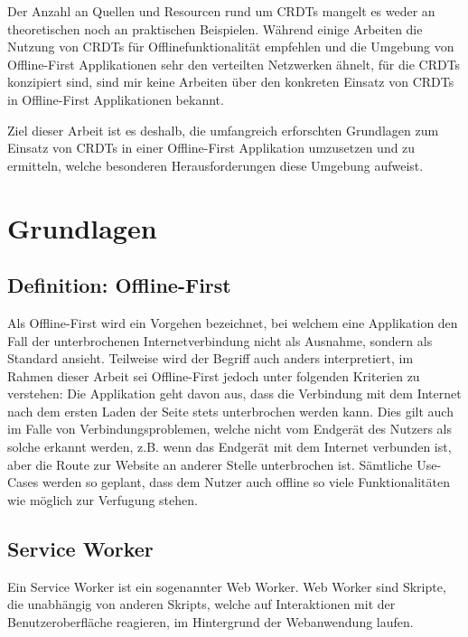 \documentclass[a4paper, 12pt]{scrreprt}
\begin{document}
Der Anzahl an Quellen und Resourcen rund um CRDTs mangelt es weder an theoretischen noch an praktischen Beispielen. Während einige Arbeiten die Nutzung von CRDTs für Offlinefunktionalität empfehlen und die Umgebung von Offline-First Applikationen sehr den verteilten Netzwerken ähnelt, für die CRDTs konzipiert sind, sind mir keine Arbeiten über den konkreten Einsatz von CRDTs in Offline-First Applikationen bekannt.

Ziel dieser Arbeit ist es deshalb, die umfangreich erforschten Grundlagen zum Einsatz von CRDTs in einer Offline-First Applikation umzusetzen und zu ermitteln, welche besonderen Herausforderungen diese Umgebung aufweist.
\chapter{Grundlagen}
\section{Definition: Offline-First}\label{sec:DefinitionOfflineFirst}
Als Offline-First wird ein Vorgehen bezeichnet, bei welchem eine Applikation den Fall der unterbrochenen Internetverbindung nicht als Ausnahme, sondern als Standard ansieht. Teilweise wird der Begriff auch anders interpretiert, im Rahmen dieser Arbeit sei Offline-First jedoch unter folgenden Kriterien zu verstehen: Die Applikation geht davon aus, dass die Verbindung mit dem Internet nach dem ersten Laden der Seite stets unterbrochen werden kann. Dies gilt auch im Falle von Verbindungsproblemen, welche nicht vom Endgerät des Nutzers als solche erkannt werden, z.B. wenn das Endgerät mit dem Internet verbunden ist, aber die Route zur Website an anderer Stelle unterbrochen ist. Sämtliche Use-Cases werden so geplant, dass dem Nutzer auch offline so viele Funktionalitäten wie möglich zur Verfugung stehen.



\section{Service Worker}
Ein Service Worker ist ein sogenannter Web Worker. Web Worker sind Skripte, die unabhängig von anderen Skripts, welche auf Interaktionen mit der Benutzeroberfläche reagieren, im Hintergrund der Webanwendung laufen\autocite{OnlineHTTPWorker}.
\end{document}
